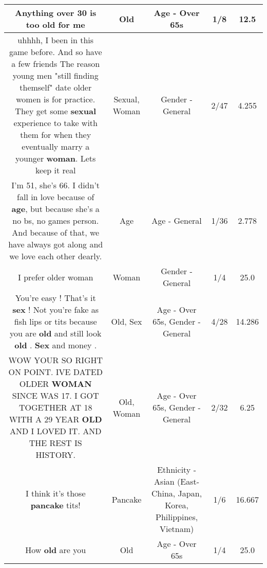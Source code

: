 \documentclass[11pt]{article}
\newlength\mylength
\begin{document}
\begin{center}
\begin{longtable}{|C{.65\mylength}|C{.30\mylength}|C{.12\mylength}|C{.12\mylength}|C{.12\mylength}|}
  \small Anything over 30 is too \textbf{old} for me\normalsize   & Old & Age - Over 65s & 1/8 & 12.5 \\  \hline
  \small uhhhh, I been in this game before. And so have a few friends   The reason young men "still finding themself" date older women is for practice.  They get some \textbf{sexual} experience to take with them for when they eventually marry a younger \textbf{woman}.  Lets keep it real\normalsize   & Sexual, Woman & Gender - General & 2/47 & 4.255 \\  \hline
  \small I'm 51, she's 66. I didn't fall in love because of \textbf{age}, but because she's a no bs, no games person. And because of that, we have always got along and we love each other dearly.\normalsize   & Age & Age - General & 1/36 & 2.778 \\  \hline
  \small I prefer older woman\normalsize   & Woman & Gender - General & 1/4 & 25.0 \\  \hline
  \small You're easy ! That's it \textbf{sex} ! Not you're fake as fish lips or tits because you are \textbf{old} and still look \textbf{old} . \textbf{Sex} and money .\normalsize   & Old, Sex & Age - Over 65s, Gender - General & 4/28 & 14.286 \\  \hline
  \small WOW YOUR SO RIGHT ON POINT. IVE DATED OLDER \textbf{WOMAN} SINCE  WAS 17. I GOT TOGETHER AT 18 WITH A 29 YEAR \textbf{OLD} AND I LOVED IT. AND THE REST IS HISTORY.\normalsize   & Old, Woman & Age - Over 65s, Gender - General & 2/32 & 6.25 \\  \hline
  \small I think it's those \textbf{pancake} tits!\normalsize   & Pancake & Ethnicity - Asian (East- China, Japan, Korea, Philippines, Vietnam) & 1/6 & 16.667 \\  \hline
  \small How \textbf{old} are you\normalsize   & Old & Age - Over 65s & 1/4 & 25.0 \\  \hline

\end{longtable}
\end{center}
\end{document}

